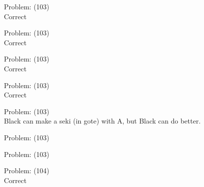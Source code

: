 \documentclass[11pt]{article}
\begin{document}
\begin{minipage}[t]{0.5\textwidth}
  {\centering
  
Problem: (103)\\
Correct\\
  }
\end{minipage}
\begin{minipage}[t]{0.5\textwidth}
  {\centering
  
Problem: (103)\\
Correct\\
  }
\end{minipage}
\begin{minipage}[t]{0.5\textwidth}
  {\centering
  
Problem: (103)\\
Correct\\
  }
\end{minipage}
\begin{minipage}[t]{0.5\textwidth}
  {\centering
  
Problem: (103)\\
Correct\\
  }
\end{minipage}
\begin{minipage}[t]{0.5\textwidth}
  {\centering
  
Problem: (103)\\
Black can make a seki (in gote) with A, but Black can do better.\\
  }
\end{minipage}
\begin{minipage}[t]{0.5\textwidth}
  {\centering
  
Problem: (103)\\
  }
\end{minipage}
\begin{minipage}[t]{0.5\textwidth}
  {\centering
  
Problem: (103)\\
  }
\end{minipage}
\begin{minipage}[t]{0.5\textwidth}
  {\centering
  
Problem: (104)\\
Correct\\
  }
\end{minipage}
\end{document}
